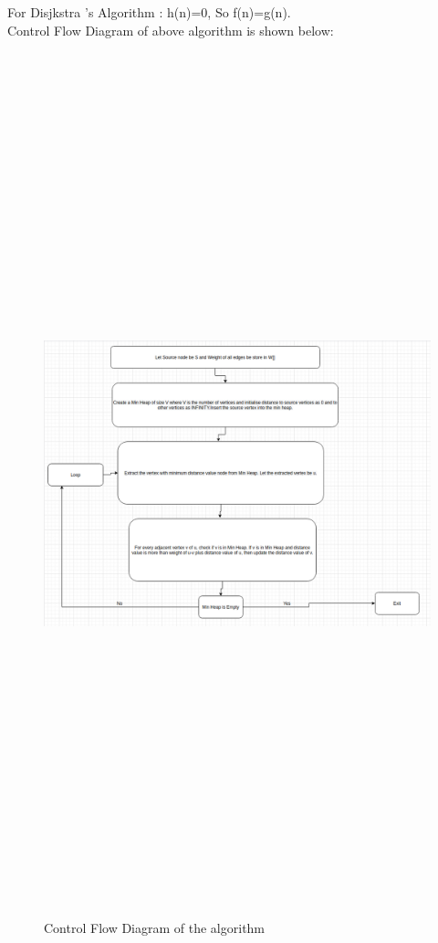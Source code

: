 \documentclass[14pt,a4]{extreport}
\begin{document}
For Disjkstra 's Algorithm : h(n)=0, So f(n)=g(n).\\
Control Flow Diagram of above algorithm is shown below:
\begin{figure}
\centering
\includegraphics[width=1.1\linewidth,height=25cm]{control_flow}
\caption{Control Flow Diagram of the algorithm}
\label{fig:1}
\end{figure}
\end{document}
